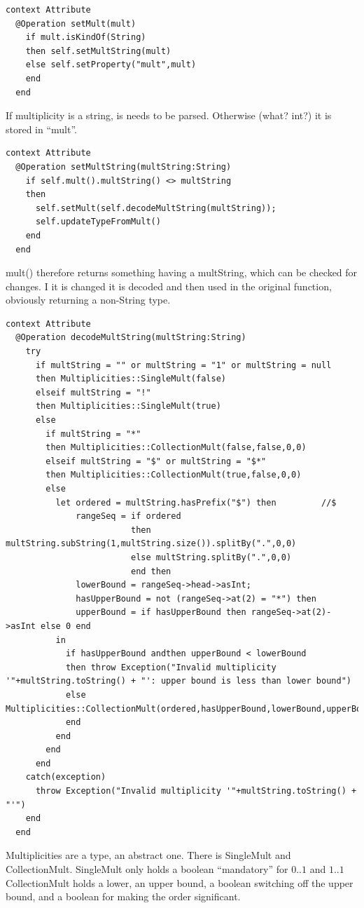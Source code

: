 \documentclass{scrreprt}
\begin{document}
\begin{verbatim}
context Attribute
  @Operation setMult(mult)
    if mult.isKindOf(String)
    then self.setMultString(mult)
    else self.setProperty("mult",mult)
    end
  end
\end{verbatim}
If multiplicity is a string, is needs to be parsed. Otherwise (what? int?) it is stored in "`mult"'.
\begin{verbatim}
context Attribute
  @Operation setMultString(multString:String)
    if self.mult().multString() <> multString
    then 
      self.setMult(self.decodeMultString(multString));
      self.updateTypeFromMult()
    end
  end
\end{verbatim}
mult() therefore returns something having a multString, which can be checked for changes. I it is changed it is decoded and then used in the original function, obviously returning a non-String type.
\begin{verbatim}
context Attribute
  @Operation decodeMultString(multString:String)
    try
      if multString = "" or multString = "1" or multString = null
      then Multiplicities::SingleMult(false)
      elseif multString = "!"
      then Multiplicities::SingleMult(true)
      else
        if multString = "*"
        then Multiplicities::CollectionMult(false,false,0,0)
        elseif multString = "$" or multString = "$*" 
        then Multiplicities::CollectionMult(true,false,0,0)
        else
          let ordered = multString.hasPrefix("$") then         //$
              rangeSeq = if ordered
                         then multString.subString(1,multString.size()).splitBy(".",0,0)
                         else multString.splitBy(".",0,0)
                         end then
              lowerBound = rangeSeq->head->asInt;
              hasUpperBound = not (rangeSeq->at(2) = "*") then
              upperBound = if hasUpperBound then rangeSeq->at(2)->asInt else 0 end
          in
            if hasUpperBound andthen upperBound < lowerBound
            then throw Exception("Invalid multiplicity '"+multString.toString() + "': upper bound is less than lower bound")
            else Multiplicities::CollectionMult(ordered,hasUpperBound,lowerBound,upperBound)
            end
          end
        end
      end
    catch(exception)
      throw Exception("Invalid multiplicity '"+multString.toString() + "'")
    end    
  end
\end{verbatim}
Multiplicities are a type, an abstract one. There is SingleMult and CollectionMult.
SingleMult only holds a boolean "`mandatory"' for $0..1$ and $1..1$
CollectionMult holds a lower, an upper bound, a boolean switching off the upper bound, and a boolean for making the order significant.
\end{document}
